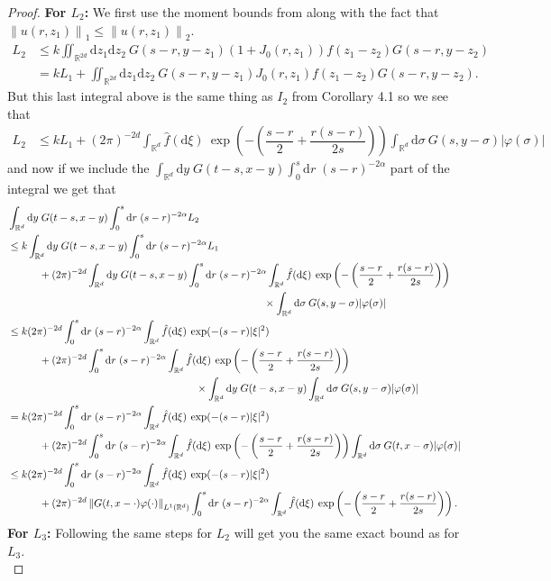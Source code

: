 \documentclass[a4paper,11pt]{article}%
\numberwithin{equation}{section}
\theoremstyle{plain}
\theoremstyle{definition}
\newcommand{\R}{\mathbb{R}}
\newcommand{\Norm}[1]{\left\|  #1   \right\|}
\newcommand{\ud}{\ensuremath{ \mathrm{d} }}
\begin{document}
\begin{proof}
\noindent \textbf{For $L_2$:} We first use the moment bounds from \cite{CH16Comparison} along with the fact that $\Norm{u(r,z_1)}_1 \le \Norm{u(r,z_1)}_2$.
\begin{align*}
L_2 & \le k\iint_{\R^{2d}}\ud z_1 \ud z_2 \:G(s-r,y-z_1)(1+J_0(r,z_1))f(z_1-z_2)G(s-r,y-z_2)
\\ &= kL_1 + \iint_{\R^{2d}}\ud z_1 \ud z_2 \:G(s-r,y-z_1)J_0(r,z_1)f(z_1-z_2)G(s-r,y-z_2).
\end{align*}
But this last integral above is the same thing as $I_2$ from Corollary 4.1 so we see that
\begin{align*}
L_2 &\le kL_1 + (2\pi)^{-2d}\int_{\R^d}\hat f(\ud \xi) \: \exp\left(-\left(\dfrac{s-r}{2}+\dfrac{r(s-r)}{2s}\right)\right) \int_{\R^d}\ud \sigma \: G(s,y-\sigma)|\varphi(\sigma)|
\end{align*}
and now if we include the $\int_{\R^d}\ud y \;G(t-s,x-y)\int_0^s\ud r\; (s-r)^{-2\alpha}$ part of the integral we get that
\begin{align*}
	   & \int_{\R^d}\ud y \;G(t-s,x-y)\int_0^s\ud r\; (s-r)^{-2\alpha} L_2
	\\ & \le k\int_{\R^d}\ud y \;G(t-s,x-y)\int_0^s\ud r\; (s-r)^{-2\alpha} L_1
	\\ & \hspace{3em}+ (2\pi)^{-2d}\int_{\R^d}\ud y \;G(t-s,x-y)\int_0^s\ud r\; (s-r)^{-2\alpha}\int_{\R^d}\hat f(\ud \xi) \: \exp\left(-\left(\dfrac{s-r}{2}+\dfrac{r(s-r)}{2s}\right)\right)
	\\ & \hspace{24.5em} \times  \int_{\R^d}\ud \sigma \: G(s,y-\sigma)|\varphi(\sigma)|
	\\ & \le k (2\pi)^{-2d} \int_0^s\ud r\; (s-r)^{-2\alpha}\int_{\R^d}\hat f (\ud \xi)\: \exp(-(s-r)|\xi|^2)
	\\ & \hspace{3em}+ (2\pi)^{-2d} \int_0^s\ud r\; (s-r)^{-2\alpha}\int_{\R^d}\hat f(\ud \xi) \: \exp\left(-\left(\dfrac{s-r}{2}+\dfrac{r(s-r)}{2s}\right)\right)
	\\ & \hspace{18 em} \times\int_{\R^d}\ud y \;G(t-s,x-y) \int_{\R^d}\ud \sigma \: G(s,y-\sigma)|\varphi(\sigma)|
	\\ & = k  (2\pi)^{-2d} \int_0^s\ud r\; (s-r)^{-2\alpha}\int_{\R^d}\hat f (\ud \xi)\: \exp(-(s-r)|\xi|^2)
	\\ & \hspace{3em} +(2\pi)^{-2d}\int_0^s\ud r\; (s-r)^{-2\alpha}\int_{\R^d}\hat f(\ud \xi) \: \exp\left(-\left(\dfrac{s-r}{2}+\dfrac{r(s-r)}{2s}\right)\right)\int_{\R^d}\ud \sigma \: G(t,x-\sigma)|\varphi(\sigma)|
	\\ & \le k  (2\pi)^{-2d}\int_0^s\ud r\; (s-r)^{-2\alpha}\int_{\R^d}\hat f (\ud \xi)\: \exp(-(s-r)|\xi|^2)
	\\ & \hspace{3em}+ (2\pi)^{-2d}  \Norm{G(t,x-\cdot)\varphi(\cdot)}_{L^1(\R^d)}\int_0^s\ud r\; (s-r)^{-2\alpha}\int_{\R^d}\hat f(\ud \xi) \: \exp\left(-\left(\dfrac{s-r}{2}+\dfrac{r(s-r)}{2s}\right)\right).
\end{align*}
\noindent \textbf{For $L_3$:} Following the same steps for $L_2$ will get you the same exact bound as for $L_3$. \\


\end{proof}
\end{document}
